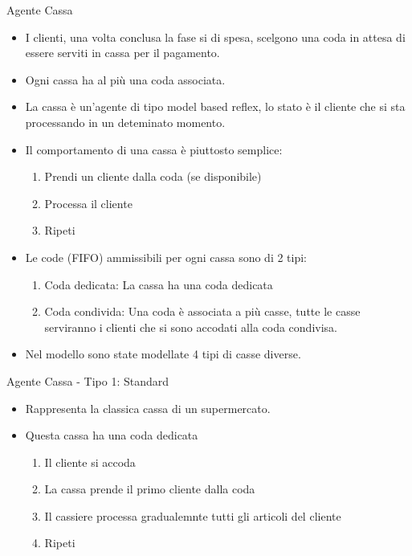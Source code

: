 \begin{frame}{Agente Cassa}
	\begin{itemize}
		\item I clienti, una volta conclusa la fase si di spesa, scelgono una coda in attesa di essere serviti in cassa per il pagamento.
		\item Ogni cassa ha al più una coda associata.
		\item La cassa è un'agente di tipo model based reflex, lo stato è il cliente che si sta processando in un deteminato momento.
		\item Il comportamento di una cassa è piuttosto semplice:
		\begin{enumerate}
			\item Prendi un cliente dalla coda (se disponibile)
			\item Processa il cliente
			\item Ripeti
		\end{enumerate}
		\item Le code (FIFO) ammissibili per ogni cassa sono di 2 tipi:
		\begin{enumerate}
			\item Coda dedicata: La cassa ha una coda dedicata
			\item Coda condivida: Una coda è associata a più casse, tutte le casse serviranno i clienti che si sono accodati alla coda condivisa.
		\end{enumerate}
		\item Nel modello sono state modellate 4 tipi di casse diverse.
	
	\end{itemize}
\end{frame}

\begin{frame}{Agente Cassa - Tipo 1: Standard}
	\begin{itemize}
		\item Rappresenta la classica cassa di un supermercato.
		\item Questa cassa ha una coda dedicata
		\begin{enumerate}
			\item Il cliente si accoda
			\item La cassa prende il primo cliente dalla coda
			\item Il cassiere processa gradualemnte tutti gli articoli del cliente
			\item Ripeti
		\end{enumerate}		
	\end{itemize}
\end{frame}

